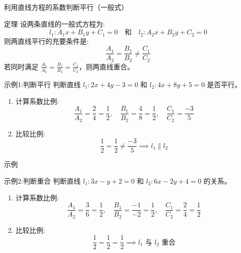 \documentclass[aspectratio=169]{ctexbeamer}
\begin{document}
\begin{frame}[allowframebreaks]{利用直线方程的系数判断平行（一般式）}
  \begin{block}{定理}
    设两条直线的一般式方程为:
    \[
    l_1: A_1x + B_1y + C_1 = 0 \quad \text{和} \quad l_2: A_2x + B_2y + C_2 = 0
    \]
    则两直线平行的充要条件是:
    \[
    \frac{A_1}{A_2} = \frac{B_1}{B_2} \neq \frac{C_1}{C_2}
    \]
    若同时满足 \(\frac{A_1}{A_2} = \frac{B_1}{B_2} = \frac{C_1}{C_2}\)，则两直线重合。
  \end{block}

  \begin{exampleblock}{示例1:判断平行}
    判断直线 \( l_1: 2x + 4y - 3 = 0 \) 和 \( l_2: 4x + 8y + 5 = 0 \) 是否平行。
    \begin{enumerate}
      \item 计算系数比例:
        \[
        \frac{A_1}{A_2} = \frac{2}{4} = \frac{1}{2}, \quad \frac{B_1}{B_2} = \frac{4}{8} = \frac{1}{2}, \quad \frac{C_1}{C_2} = \frac{-3}{5}
        \]
      \item 比较比例:
        \[
        \frac{1}{2} = \frac{1}{2} \neq \frac{-3}{5} \implies l_1 \parallel l_2
        \]
    \end{enumerate}
  \end{exampleblock}
\end{frame}



\begin{frame}{示例}
  \begin{exampleblock}{示例2:判断重合}
    判断直线 \( l_1: 3x - y + 2 = 0 \) 和 \( l_2: 6x - 2y + 4 = 0 \) 的关系。
    \begin{enumerate}
      \item 计算系数比例:
        \[
        \frac{A_1}{A_2} = \frac{3}{6} = \frac{1}{2}, \quad \frac{B_1}{B_2} = \frac{-1}{-2} = \frac{1}{2}, \quad \frac{C_1}{C_2} = \frac{2}{4} = \frac{1}{2}
        \]
      \item 比较比例:
        \[
        \frac{1}{2} = \frac{1}{2} = \frac{1}{2} \implies l_1 \text{ 与 } l_2 \text{ 重合}
        \]
    \end{enumerate}
  \end{exampleblock}

\end{frame}
\end{document}
